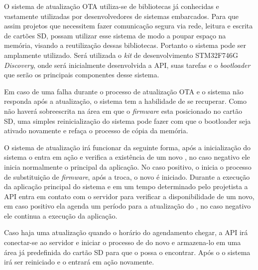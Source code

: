 O sistema de atualização OTA utiliza-se de bibliotecas já conhecidas e vastamente utilizadas por desenvolvedores de sistemas embarcados. Para que assim projetos que necessitem fazer comunicação segura via rede, leitura e escrita de cartões SD, possam utilizar esse sistema de modo a poupar espaço na memória, visando a reutilização dessas bibliotecas. Portanto o sistema pode ser amplamente utilizado. Será utilizada o \textit{kit} de desenvolvimento STM32F746G \textit{Discovery}, onde será inicialmente desenvolvida a API, suas tarefas e o \textit{bootloader} que serão os principais componentes desse sistema.

Em caso de uma falha durante o processo de atualização OTA e o sistema não responda após a atualização, o sistema tem a habilidade de se recuperar. Como não haverá sobreescrita na área em que o \textit{firmware} esta posicionado no cartão SD, uma simples reinicialização do sistema pode fazer com que o bootloader seja ativado novamente e refaça o processo de cópia da memória.

O sistema de atualização irá funcionar da seguinte forma, após a inicialização do sistema o \bootloader entra em ação e verifica a existência de um novo \firmware, no caso negativo ele inicia normalmente o \software principal da aplicação. No caso positivo, o \bootloader inicia o processo de substituição de \textit{firmware}, após a troca, o novo \software é iniciado. Durante a execução da aplicação principal do sistema e em um tempo determinado pelo projetista a API entra em contato com o servidor para verificar a disponibilidade de um \software novo, em caso positivo ela agenda um período para a atualização do \firmware, no caso negativo ele continua a execução da aplicação. 

Caso haja uma atualização quando o horário do agendamento chegar, a API irá conectar-se ao servidor e iniciar o processo de \download do \firmware novo e armazena-lo em uma área já predefinida do cartão SD para que o \bootloader possa o encontrar. Após o \download o sistema irá ser reiniciado e o \bootloader entrará em ação novamente. 





